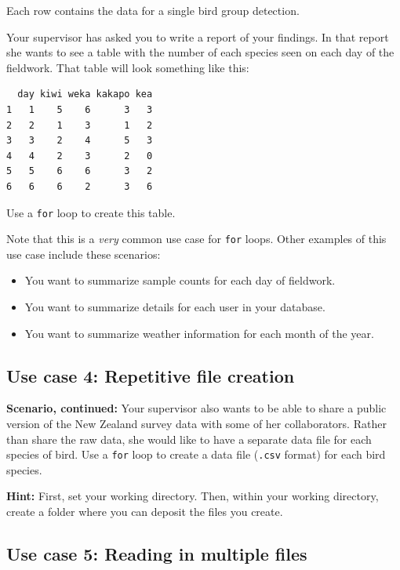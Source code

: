 \documentclass[]{book}
\begin{document}
Each row contains the data for a single bird group detection.

Your supervisor has asked you to write a report of your findings. In that report she wants to see a table with the number of each species seen on each day of the fieldwork. That table will look something like this:

\begin{verbatim}
  day kiwi weka kakapo kea
1   1    5    6      3   3
2   2    1    3      1   2
3   3    2    4      5   3
4   4    2    3      2   0
5   5    6    6      3   2
6   6    6    2      3   6
\end{verbatim}

Use a \texttt{for} loop to create this table.

Note that this is a \emph{very} common use case for \texttt{for} loops. Other examples of this use case include these scenarios:

\begin{itemize}
\item
  You want to summarize sample counts for each day of fieldwork.
\item
  You want to summarize details for each user in your database.
\item
  You want to summarize weather information for each month of the year.
\end{itemize}

\hypertarget{use-case-4-repetitive-file-creation}{%
\subsection*{Use case 4: Repetitive file creation}\label{use-case-4-repetitive-file-creation}}

\textbf{Scenario, continued:} Your supervisor also wants to be able to share a public version of the New Zealand survey data with some of her collaborators. Rather than share the raw data, she would like to have a separate data file for each species of bird. Use a \texttt{for} loop to create a data file (\texttt{.csv} format) for each bird species.

\textbf{Hint:} First, set your working directory. Then, within your working directory, create a folder where you can deposit the files you create.

\hypertarget{use-case-5-reading-in-multiple-files}{%
\subsection*{Use case 5: Reading in multiple files}\label{use-case-5-reading-in-multiple-files}}
\end{document}
